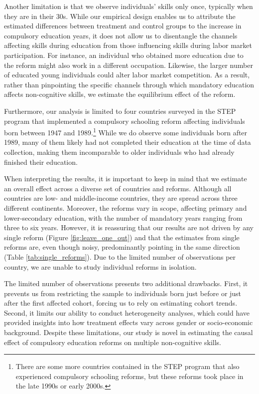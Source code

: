 Another limitation is that we observe individuals' skills only once, typically when they are in their 30s. While our empirical design enables us to attribute the estimated differences between treatment and control groups to the increase in compulsory education years, it does not allow us to disentangle the channels affecting skills during education from those influencing skills during labor market participation. For instance, an individual who obtained more education due to the reform might also work in a different occupation. Likewise, the larger number of educated young individuals could alter labor market competition. As a result, rather than pinpointing the specific channels through which mandatory education affects non-cognitive skills, we estimate the equilibrium effect of the reform.

Furthermore, our analysis is limited to four countries surveyed in the STEP program that implemented a compulsory schooling reform affecting individuals born between 1947 and 1989.\footnote{There are some more countries contained in the STEP program that also experienced compulsory schooling reforms, but these reforms took place in the late 1990s or early 2000s.} While we do observe some individuals born after 1989, many of them likely had not completed their education at the time of data collection, making them incomparable to older individuals who had already finished their education.

When interpreting the results, it is important to keep in mind that we estimate an overall effect across a diverse set of countries and reforms. Although all countries are low- and middle-income countries, they are spread across three different continents. Moreover, the reforms vary in scope, affecting primary and lower-secondary education, with the number of mandatory years ranging from three to six years. However, it is reassuring that our results are not driven by any single reform (Figure \ref{fig:leave_one_out}) and that the estimates from single reforms are, even though noisy, predominantly pointing in the same direction (Table \ref{tab:single_reforms}). Due to the limited number of observations per country, we are unable to study individual reforms in isolation.

The limited number of observations presents two additional drawbacks. First, it prevents us from restricting the sample to individuals born just before or just after the first affected cohort, forcing us to rely on estimating cohort trends. Second, it limits our ability to conduct heterogeneity analyses, which could have provided insights into how treatment effects vary across gender or socio-economic background. Despite these limitations, our study is novel in estimating the causal effect of compulsory education reforms on multiple non-cognitive skills.
